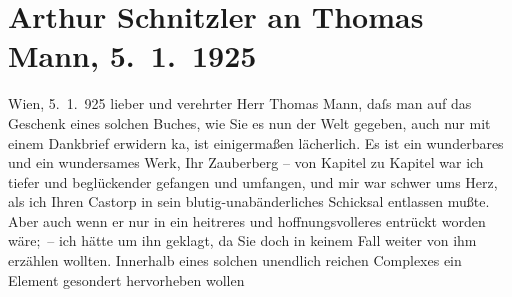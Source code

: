

         
         \newcommand{\erwaehntePersonen}{Personen: Thomas Mann}
         \newcommand{\erwaehnteOrte}{Orte: Wien}
         \newcommand{\erwaehnteWerke}{Werke: Der Zauberberg. Roman}
               \section[Arthur Schnitzler an Thomas Mann, 5. 1. 1925]{ Arthur Schnitzler an Thomas Mann, 5. 1. 1925}\nopagebreak{}\rehead{ }\begin{ledgroupsized}[t]{13cm}\normalsize\beginnumbering \toendnotes[C]{\smallbreak\pagebreak[2]} 
\toendnotes[C]{\smallbreak}\pstart
           \raggedleft{}{\pb}Wien, 5. 1. 925\pend
           \pstart{}lieber und verehrter Herr Thomas Mann,\pend\pstart
           daſs man auf das Geschenk eines solchen Buches, wie Sie es nun der Welt gegeben, auch
               nur mit einem Dankbrief erwidern ka{\geminationn}, ist einigermaßen
               lächerlich. Es ist ein wunderbares und ein wundersames Werk, Ihr Zauberberg – von Kapitel zu Kapitel war ich tiefer und
               beglückender gefangen und umfangen, und mir war schwer ums Herz, als ich Ihren Castorp in sein
               blutig-unabänderliches Schicksal entlassen mußte. Aber auch wenn er nur in ein
               heitreres und hoffnungsvolleres entrückt worden wäre; – ich hätte um ihn geklagt, da
               Sie doch in keinem Fall weiter von ihm erzählen wollten. Innerhalb {\pb}eines solchen unendlich reichen Complexes ein Element gesondert hervorheben wollen

\end{ledgroupsized}
